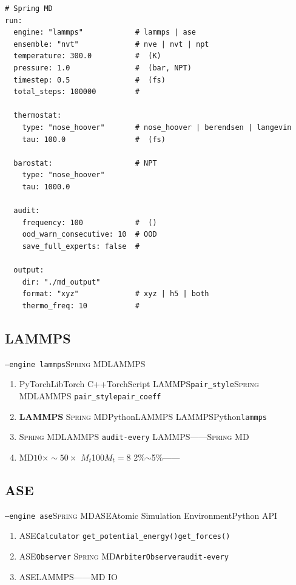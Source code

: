 \documentclass[12pt,a4paper]{article}
\theoremstyle{remark}
\newcommand{\SpringMD}{\textsc{Spring MD}}
\begin{document}
\begin{lstlisting}[caption={\texttt{md\_config.yaml} },label=lst:md_config]
# Spring MD 
run:
  engine: "lammps"            # lammps | ase
  ensemble: "nvt"             # nve | nvt | npt
  temperature: 300.0          #  (K)
  pressure: 1.0               #  (bar, NPT)
  timestep: 0.5               #  (fs)
  total_steps: 100000         # 

  thermostat:
    type: "nose_hoover"       # nose_hoover | berendsen | langevin
    tau: 100.0                #  (fs)

  barostat:                   # NPT
    type: "nose_hoover"
    tau: 1000.0

  audit:
    frequency: 100            #  ()
    ood_warn_consecutive: 10  # OOD
    save_full_experts: false  # 

  output:
    dir: "./md_output"
    format: "xyz"             # xyz | h5 | both
    thermo_freq: 10           # 
\end{lstlisting}

\subsection{LAMMPS}

\texttt{--engine lammps}\SpringMD{}LAMMPS

\begin{enumerate}[label=(\arabic*),itemsep=3pt]
    \item \textbf{} PyTorchLibTorch C++TorchScript
    LAMMPS\texttt{pair\_style}\SpringMD{}LAMMPS
    \texttt{pair\_style}\texttt{pair\_coeff}

    \item \textbf{LAMMPS} \SpringMD{}PythonLAMMPS
    LAMMPSPython\texttt{lammps}

    \item \textbf{} \SpringMD{}LAMMPS
    \texttt{audit-every}
    LAMMPS——\SpringMD{}

    \item \textbf{} MD$10\times \sim 50\times$
    $M_t$100$M_t=8$
    2\%$\sim$5\%——
\end{enumerate}

\subsection{ASE}

\texttt{--engine ase}\SpringMD{}ASEAtomic Simulation EnvironmentPython API

\begin{enumerate}[label=(\arabic*),itemsep=3pt]
    \item \textbf{} ASE\texttt{Calculator}
    \texttt{get\_potential\_energy()}\texttt{get\_forces()}

    \item \textbf{} ASE\texttt{Observer}
    \SpringMD{}\texttt{ArbiterObserver}\texttt{audit-every}

    \item \textbf{} ASELAMMPS——MD
    IO
\end{enumerate}
\end{document}
